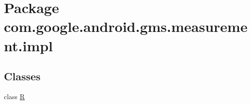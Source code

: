 \hypertarget{namespacecom_1_1google_1_1android_1_1gms_1_1measurement_1_1impl}{}\section{Package com.\+google.\+android.\+gms.\+measurement.\+impl}
\label{namespacecom_1_1google_1_1android_1_1gms_1_1measurement_1_1impl}
\subsection*{Classes}
\begin{DoxyCompactItemize}
\item 
class \mbox{\hyperlink{classcom_1_1google_1_1android_1_1gms_1_1measurement_1_1impl_1_1R}{R}}
\end{DoxyCompactItemize}
